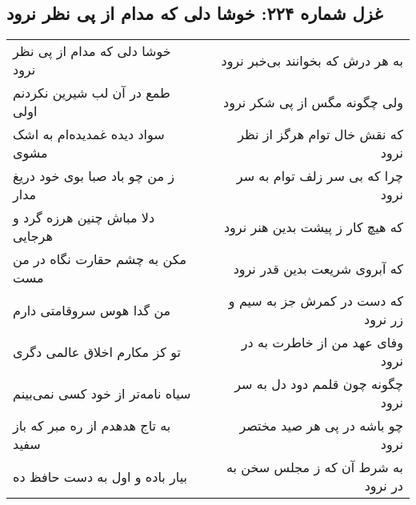 \begin{center}
\section*{غزل شماره ۲۲۴: خوشا دلی که مدام از پی نظر نرود}
\label{sec:sh224}
\begin{longtable}{l p{0.5cm} r}
خوشا دلی که مدام از پی نظر نرود
&&
به هر درش که بخوانند بی‌خبر نرود
\\
طمع در آن لب شیرین نکردنم اولی
&&
ولی چگونه مگس از پی شکر نرود
\\
سواد دیده غمدیده‌ام به اشک مشوی
&&
که نقش خال توام هرگز از نظر نرود
\\
ز من چو باد صبا بوی خود دریغ مدار
&&
چرا که بی سر زلف توام به سر نرود
\\
دلا مباش چنین هرزه گرد و هرجایی
&&
که هیچ کار ز پیشت بدین هنر نرود
\\
مکن به چشم حقارت نگاه در من مست
&&
که آبروی شریعت بدین قدر نرود
\\
من گدا هوس سروقامتی دارم
&&
که دست در کمرش جز به سیم و زر نرود
\\
تو کز مکارم اخلاق عالمی دگری
&&
وفای عهد من از خاطرت به در نرود
\\
سیاه نامه‌تر از خود کسی نمی‌بینم
&&
چگونه چون قلمم دود دل به سر نرود
\\
به تاج هدهدم از ره مبر که باز سفید
&&
چو باشه در پی هر صید مختصر نرود
\\
بیار باده و اول به دست حافظ ده
&&
به شرط آن که ز مجلس سخن به در نرود
\\
\end{longtable}
\end{center}
